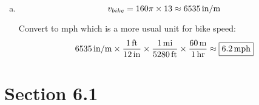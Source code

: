 \documentclass{exam}
\begin{document}
\begin{description}
\begin{enumerate}[(a)]
          \item 
            \[
              v_{bike} = 160 \pi \times 13 \approx \unit[ 6535 ]{in/m}
            \]

            Convert to mph which is a more usual unit for bike speed:
            \[
              \unit[ 6535 ]{in/m} \times \frac{\unit[1]{ft}}{\unit[12]{in}} \times \frac{\unit[1]{mi}}{\unit[5280]{ft}}
              \times \frac{\unit[60]{m}}{\unit[1]{hr}} \approx \boxed{ \unit[6.2]{mph} }
            \]


        \end{enumerate}
    \end{description}

    \section{Section 6.1}
\end{document}
